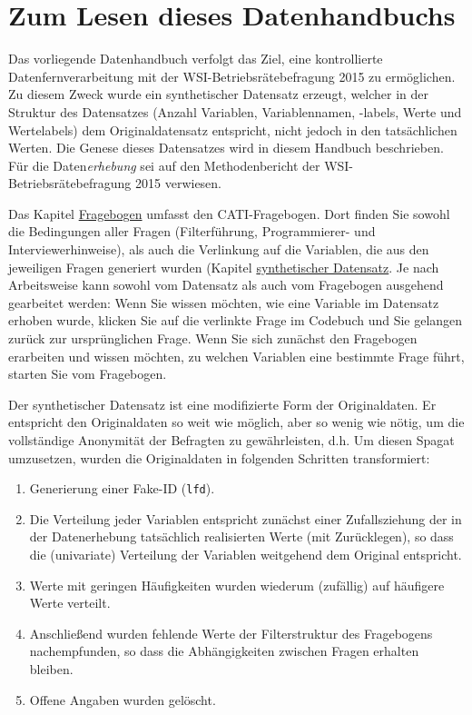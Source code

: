 \section{Zum Lesen dieses Datenhandbuchs}

Das vorliegende Datenhandbuch verfolgt das Ziel, eine kontrollierte Datenfernverarbeitung mit der WSI-Be\-triebs\-rä\-te\-be\-fra\-gung 2015 zu ermöglichen. Zu diesem Zweck wurde ein synthetischer Datensatz erzeugt, welcher in der Struktur des Datensatzes (Anzahl Variablen, Variablennamen, -labels, Werte und Wertelabels) dem Originaldatensatz entspricht, nicht jedoch in den tatsächlichen Werten. Die Genese dieses Datensatzes wird in diesem Handbuch beschrieben. Für die Daten\textit{erhebung} sei auf den Methodenbericht der WSI-Betriebsrätebefragung 2015 verwiesen.

Das Kapitel \hyperref[kap_fragebogen]{Fragebogen} umfasst den CATI-Fragebogen. Dort finden Sie sowohl die Bedingungen aller Fragen (Filterführung, Programmierer- und Interviewerhinweise), als auch die Verlinkung auf die Variablen, die aus den jeweiligen Fragen generiert wurden (Kapitel \hyperref[kap_rohdaten]{synthetischer Datensatz}. Je nach Arbeitsweise kann sowohl vom Datensatz als auch vom Fragebogen ausgehend gearbeitet werden: Wenn Sie wissen möchten, wie eine Variable im Datensatz erhoben wurde, klicken Sie auf die verlinkte Frage im Codebuch und Sie gelangen zurück zur ursprünglichen Frage. Wenn Sie sich zunächst den Fragebogen erarbeiten und wissen möchten, zu welchen Variablen eine bestimmte Frage führt, starten Sie vom Fragebogen.

Der synthetischer Datensatz ist eine modifizierte Form der Originaldaten. Er entspricht den Originaldaten so weit wie möglich, aber so wenig wie nötig, um die vollständige Anonymität der Befragten zu gewährleisten, d.h. Um diesen Spagat umzusetzen, wurden die Originaldaten in folgenden Schritten transformiert:

\begin{enumerate}

\item Generierung einer Fake-ID (\texttt{lfd}). 

\item Die Verteilung jeder Variablen entspricht zunächst einer Zufallsziehung der in der Datenerhebung tatsächlich realisierten Werte (mit Zurücklegen), so dass die (univariate) Verteilung der Variablen weitgehend dem Original entspricht.

\item Werte mit geringen Häufigkeiten wurden wiederum (zufällig) auf häufigere Werte verteilt.

\item Anschließend wurden fehlende Werte der Filterstruktur des Fragebogens nachempfunden, so dass die Abhängigkeiten zwischen Fragen erhalten bleiben.

\item Offene Angaben wurden gelöscht.

\end{enumerate}

